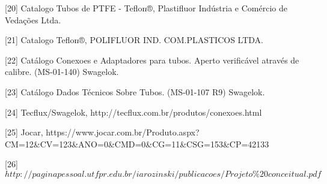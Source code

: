 [20] Catalogo Tubos de PTFE - Teflon®, Plastifluor Indústria e Comércio de Vedações Ltda.

[21] Catalogo Teflon®, POLIFLUOR IND. COM.PLASTICOS LTDA. 

[22] Catálogo Conexoes e Adaptadores para tubos. Aperto verificável através de calibre. (MS-01-140) Swagelok.

[23] Catálogo Dados Técnicos Sobre Tubos. (MS-01-107 R9) Swagelok.

[24] Tecflux/Swagelok, http://tecflux.com.br/produtos/conexoes.html

[25] Jocar, https://www.jocar.com.br/Produto.aspx?CM=12\&CV=123\&ANO=0\&CMD=0\&CG=11\&CSG=153\&CP=42133

[26] $http://paginapessoal.utfpr.edu.br/iarozinski/publicacoes/Projeto\%20conceitual.pdf$
